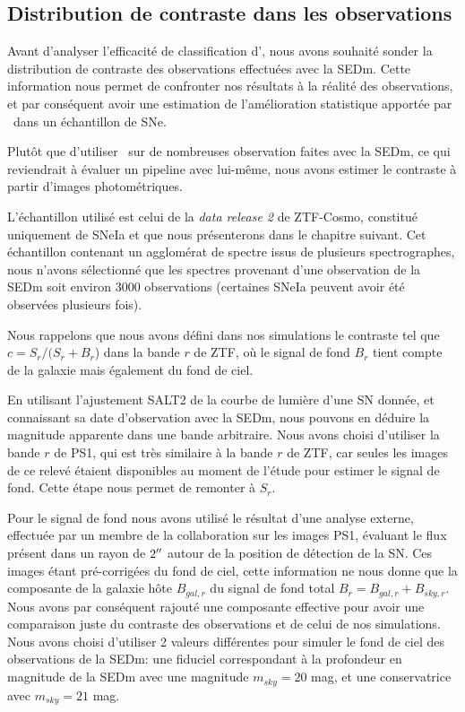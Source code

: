 \documentclass[../main/main.tex]{subfiles}
\begin{document}

\subsection{Distribution de contraste dans les observations}

Avant d'analyser l'efficacité de classification d'\hypergal, nous avons
souhaité sonder la distribution de contraste des observations
effectuées avec la SEDm. Cette information nous permet de
confronter nos résultats à la réalité des observations, et par
conséquent avoir une estimation de l'amélioration statistique
apportée par \hypergal\ dans un échantillon de SNe.

Plutôt que d'utiliser \hypergal\ sur de nombreuses observation faites
avec la SEDm, ce qui reviendrait à évaluer un pipeline avec lui-même,
nous avons estimer le contraste à partir d'images photométriques.

L'échantillon utilisé est celui de la \textit{data release 2} de
ZTF-Cosmo, constitué uniquement de SNeIa et que nous présenterons dans le
chapitre suivant. Cet échantillon contenant un agglomérat de spectre
issus de
plusieurs spectrographes, nous n'avons sélectionné que les spectres
provenant d'une observation de la SEDm soit environ $3000$ observations
(certaines SNeIa peuvent avoir été observées plusieurs fois).

Nous rappelons que nous avons défini dans nos simulations le contraste
tel que \mbox{$c=S_{r}/(S_{r}+B_{r}$)}
dans la bande $r$ de ZTF, où le signal de fond $B_{r}$ tient compte de
la galaxie mais également du fond de ciel.

En utilisant l'ajustement SALT2 de la
courbe de lumière d'une SN donnée, et connaissant sa date d'observation
avec la SEDm, nous
pouvons en déduire la magnitude apparente dans une bande
arbitraire. Nous avons choisi d'utiliser la bande $r$ de PS1, qui est très
similaire à la bande $r$ de ZTF, car seules les images de ce relevé
étaient disponibles au moment de l'étude pour estimer le signal de
fond. Cette étape nous permet de remonter à $S_{r}$.

Pour le signal de fond nous avons utilisé le résultat d'une analyse externe, effectuée par un membre de
la collaboration sur les images PS1, évaluant le flux présent dans un
rayon de $2^{\prime\prime}$ autour de la position de détection de la SN.
Ces images étant pré-corrigées du fond de ciel, cette information ne
nous donne que la composante de la galaxie hôte $B_{gal,r}$ du signal de
fond total $B_{r}=B_{gal,r}+B_{sky,r}$.
Nous avons par conséquent rajouté
une composante effective pour avoir une comparaison juste du contraste
des observations et de celui de nos simulations. Nous avons choisi
d'utiliser 2 valeurs différentes pour simuler le fond de ciel des
observations de la SEDm: une fiduciel correspondant à la profondeur en
magnitude de la SEDm avec une magnitude $m_{sky}=20$ mag, et une
conservatrice avec $m_{sky}=21$ mag. 
\end{document}
